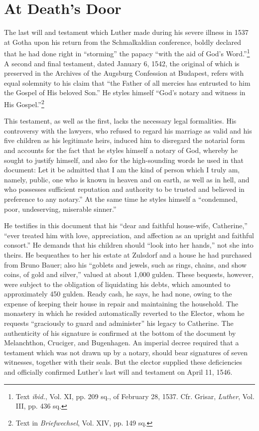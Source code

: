 \section{At Death’s Door}

The last will and testament which Luther made during his severe
illness in 1537 at Gotha upon his return from the Schmalkaldian conference,
boldly declared that he had done right in “storming” the
papacy “with the aid of God’s Word.”\footnote
{Text \textit{ibid.}, Vol. XI, pp. 209 sq., of February 28, 1537. Cfr. Grisar, \textit{Luther}, Vol. III,
pp. 436 sq.}
A second and final testament,
dated January 6, 1542, the original of which is preserved in the
Archives of the Augsburg Confession at Budapest, refers with equal
solemnity to his claim that “the Father of all mercies has entrusted
to him the Gospel of His beloved Son.” He styles himself “God’s notary
and witness in His Gospel.”\footnote{Text in \textit{Briefwechsel}, Vol. XIV, pp. 149 sq.}

This testament, as well as the first, lacks the necessary legal formalities.
His controversy with the lawyers, who refused to regard his
marriage as valid and his five children as his legitimate heirs, induced
him to disregard the notarial form and accounts for the fact that he
styles himself a notary of God, whereby he sought to justify himself,
and also for the high-sounding words he used in that document:
Let it be admitted that I am the kind of person which I truly am,
namely, public, one who is known in heaven and on earth, as well
as in hell, and who possesses sufficient reputation and authority to
be trusted and believed in preference to any notary.” At the same
time he styles himself a “condemned, poor, undeserving, miserable
sinner.”

He testifies in this document that his “dear and faithful house-wife,
Catherine,” “ever treated him with love, appreciation, and affection
as an upright and faithful consort.” He demands that his children
should “look into her hands,” not she into theirs. He bequeathes to
her his estate at Zulsdorf and a house he had purchased from Bruno
Bauer; also his “goblets and jewels, such as rings, chains, and show
coins, of gold and silver,” valued at about 1,000 gulden. These bequests,
however, were subject to the obligation of liquidating his
debts, which amounted to approximately 450 gulden. Ready cash,
he says, he had none, owing to the expense of keeping their house
in repair and maintaining the household. The monastery in which he
resided automatically reverted to the Elector, whom he requests “graciously
to guard and administer” his legacy to Catherine. The
authenticity of his signature is confirmed at the bottom of the document
by Melanchthon, Cruciger, and Bugenhagen. An imperial decree required
that a testament which was not drawn up by a notary,
should bear signatures of seven witnesses, together with their seals.
But the elector supplied these deficiencies and officially confirmed
Luther’s last will and testament on April 11, 1546.

